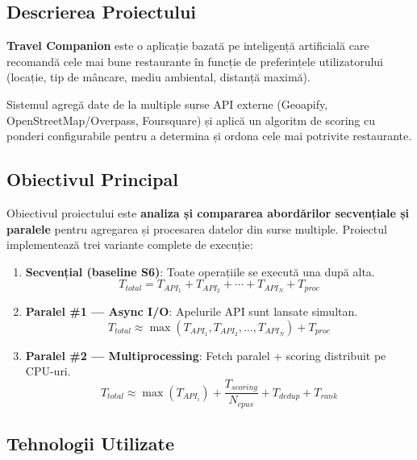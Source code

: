 \documentclass[12pt,a4paper]{article}
\begin{document}
\subsection{Descrierea Proiectului}

\textbf{Travel Companion} este o aplicație bazată pe inteligență artificială care recomandă cele mai bune restaurante în funcție de preferințele utilizatorului (locație, tip de mâncare, mediu ambiental, distanță maximă).

Sistemul agregă date de la multiple surse API externe (Geoapify, OpenStreetMap/Overpass, Foursquare) și aplică un algoritm de scoring cu ponderi configurabile pentru a determina și ordona cele mai potrivite restaurante.

\subsection{Obiectivul Principal}

Obiectivul proiectului este \textbf{analiza și compararea abordărilor secvențiale și paralele} pentru agregarea și procesarea datelor din surse multiple. Proiectul implementează trei variante complete de execuție:

\begin{enumerate}
  \item \textbf{Secvențial (baseline S6)}: Toate operațiile se execută una după alta.
        \[ T_{total} = T_{API_1} + T_{API_2} + \cdots + T_{API_N} + T_{proc} \]
  \item \textbf{Paralel \#1 --- Async I/O}: Apelurile API sunt lansate simultan.
        \[ T_{total} \approx \max(T_{API_1}, T_{API_2}, \ldots, T_{API_N}) + T_{proc} \]
  \item \textbf{Paralel \#2 --- Multiprocessing}: Fetch paralel + scoring distribuit pe CPU-uri.
        \[ T_{total} \approx \max(T_{API_i}) + \frac{T_{scoring}}{N_{cpus}} + T_{dedup} + T_{rank} \]
\end{enumerate}

\subsection{Tehnologii Utilizate}
\end{document}
